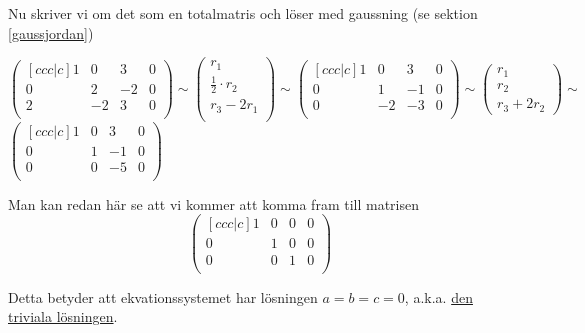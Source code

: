 \documentclass[../../main.tex]{subfiles}
\begin{document}
\begin{solution}{6}
Nu skriver vi om det som en totalmatris och löser med gaussning (se sektion \ref{gaussjordan})

$$
\begin{pmatrix}[ccc|c]
1 & 0 & 3 & 0\\
0 & 2 & -2 & 0\\
2 & -2 & 3 & 0\\
\end{pmatrix}
\sim 
\begin{pmatrix}
r_1\\
\frac{1}{2}\cdot r_2\\
r_3 - 2r_1\\
\end{pmatrix}
\sim
\begin{pmatrix}[ccc|c]
1 & 0 & 3 & 0\\
0 & 1 & -1 & 0\\
0 & -2 & -3 & 0\\
\end{pmatrix}
\sim
\begin{pmatrix}
r_1\\r_2\\r_3+2r_2
\end{pmatrix}
\sim
$$
$
\begin{pmatrix}[ccc|c]
1 & 0 & 3 & 0\\
0 & 1 & -1 & 0\\
0 & 0 & -5 & 0\\
\end{pmatrix}
$

Man kan redan här se att vi kommer att komma fram till matrisen
$$\begin{pmatrix}[ccc|c]
1 & 0 & 0 & 0\\
0 & 1 & 0 & 0\\
0 & 0 & 1 & 0\\
\end{pmatrix}$$

Detta betyder att ekvationssystemet har lösningen $a = b = c = 0$, a.k.a. \underline{den triviala lösningen}.

\end{solution}
\end{document}
